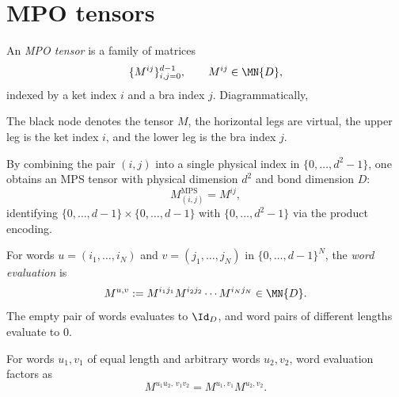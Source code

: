 \section{MPO tensors}

\begin{definition}\label{def:mpo_tensor}
    \leanok
    An \emph{MPO tensor} is a family of matrices
    \[
        \{M^{ij}\}_{i,j=0}^{d-1}, \qquad M^{ij} \in \MN{D},
    \]
    indexed by a ket index $i$ and a bra index $j$. Diagrammatically,
    \begin{center}
    \end{center}
    The black node denotes the tensor $M$, the horizontal legs are virtual,
    the upper leg is the ket index $i$, and the lower leg is the bra
    index $j$.
\end{definition}

\begin{definition}\label{def:mpo_to_mps}
    \leanok
    By combining the pair $(i,j)$ into a single physical index in
    $\{0,\ldots,d^2-1\}$, one obtains an MPS tensor with physical dimension
    $d^2$ and bond dimension $D$:
    \[
        M^{\mathrm{MPS}}_{(i,j)} = M^{ij},
    \]
    identifying $\{0,\ldots,d{-}1\} \times \{0,\ldots,d{-}1\}$ with
    $\{0,\ldots,d^2{-}1\}$ via the product encoding.
\end{definition}

\begin{definition}\label{def:mpo_eval_word}
    \leanok
    For words
    $u = (i_1,\ldots,i_N)$ and $v = (j_1,\ldots,j_N)$ in $\{0,\ldots,d{-}1\}^N$,
    the \emph{word evaluation} is
    \[
        M^{u,v} := M^{i_1 j_1} M^{i_2 j_2} \cdots M^{i_N j_N} \in \MN{D}.
    \]
    The empty pair of words evaluates to $\Id_D$, and word pairs of different
    lengths evaluate to $0$.
\end{definition}

\begin{lemma}\label{lem:mpo_eval_word_append}
    \leanok
    For words $u_1,v_1$ of equal length and arbitrary words $u_2,v_2$,
    word evaluation factors as
    \[
        M^{u_1u_2,\,v_1v_2}=M^{u_1,v_1}M^{u_2,v_2}.
    \]
\end{lemma}

